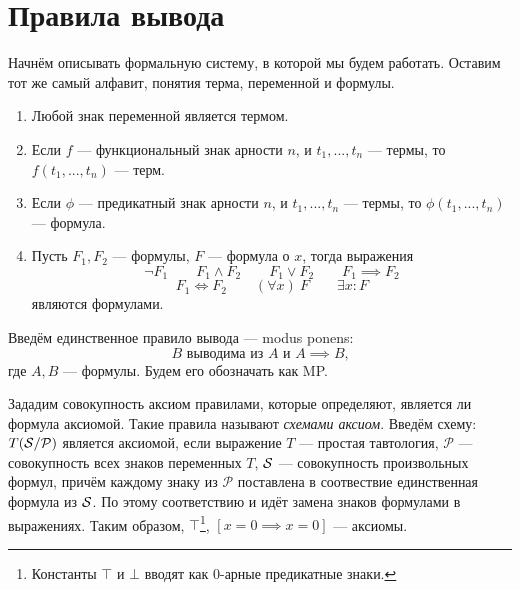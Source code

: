 \section{Правила вывода}

Начнём описывать формальную систему, в которой мы будем работать.
Оставим тот же самый алфавит, понятия терма, переменной и формулы.
\begin{fullwidth}
  \begin{multicols}{2}
    \begin{enumerate}
      \item{}Любой знак переменной является термом.
      \item{}Если $f$ --- функциональный знак арности $n$, и $t_1,...,t_{n}$ --- термы,
      то $f(t_1,...,t_{n})$ --- терм.
      \item{}Если $\phi$ --- предикатный знак арности $n$, и $t_1,...,t_{n}$ --- термы,
      то $\phi(t_1,...,t_{n})$ --- формула.

      \columnbreak

      \item{}Пусть $F_1,F_2$ --- формулы, $F$ --- формула о $x$, тогда выражения
      \[
        \lnot F_1\qquad F_1\land F_2\qquad F_1\lor F_2\qquad
        F_1\implies F_2
      \]
      \[
        F_1\iff F_2\qquad (\forall x)~F\qquad
        \exists x:F
      \]
      являются формулами.
    \end{enumerate}
  \end{multicols}
\end{fullwidth}

\newcommand\taut{$\mathcal T$}
\newcommand\axiom{$\mathcal A$}
\newcommand\implic{$\mathcal I$}
\newcommand\Px{\mathcal P}

Введём единственное правило вывода --- modus ponens:
\[
  \text{$B$ выводима из $A$ и $A\implies B$,}
\]
где $A,B$ --- формулы. Будем его обозначать как MP.

Зададим совокупность аксиом правилами,
которые определяют, является ли формула аксиомой.
Такие правила называют {\it схемами аксиом}.
Введём схему: $T(\Sx/\Px)$ является аксиомой,
если выражение $T$ --- простая тавтология,
$\Px$ --- совокупность всех знаков переменных $T$,
$\mathcal S$ --- совокупность произвольных формул,
причём каждому знаку из $\Px$
поставлена в соотвествие единственная формула из $\mathcal S$.
По этому соответствию и идёт замена знаков формулами в выражениях.
Таким образом, $\top$\footnote{Константы $\top$ и $\bot$ вводят как
  \mbox{$0$-арные} предикатные знаки.}, $[x=0\implies x=0]$ --- аксиомы.

